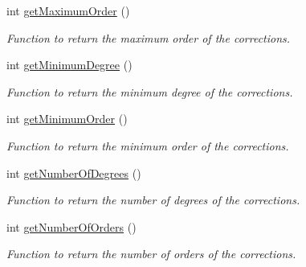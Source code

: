 \begin{DoxyCompactItemize}
int \hyperlink{classtudat_1_1gravitation_1_1GravityFieldVariations_a7bf60004124e9b4ffb848bc65d79fffe}{get\+Maximum\+Order} ()
\begin{DoxyCompactList}\small\item\em Function to return the maximum order of the corrections. \end{DoxyCompactList}\item 
int \hyperlink{classtudat_1_1gravitation_1_1GravityFieldVariations_ac94b3de70f1076be33863e7f5dd9ee06}{get\+Minimum\+Degree} ()
\begin{DoxyCompactList}\small\item\em Function to return the minimum degree of the corrections. \end{DoxyCompactList}\item 
int \hyperlink{classtudat_1_1gravitation_1_1GravityFieldVariations_a7441c32cc79d98603b85c404acaeb9b7}{get\+Minimum\+Order} ()
\begin{DoxyCompactList}\small\item\em Function to return the minimum order of the corrections. \end{DoxyCompactList}\item 
int \hyperlink{classtudat_1_1gravitation_1_1GravityFieldVariations_a5282fb284729fde0dcafb4fe6741e258}{get\+Number\+Of\+Degrees} ()
\begin{DoxyCompactList}\small\item\em Function to return the number of degrees of the corrections. \end{DoxyCompactList}\item 
int \hyperlink{classtudat_1_1gravitation_1_1GravityFieldVariations_a24e2d4646f61f2d7368f12ad152f1efc}{get\+Number\+Of\+Orders} ()
\begin{DoxyCompactList}\small\item\em Function to return the number of orders of the corrections. \end{DoxyCompactList}\end{DoxyCompactItemize}
